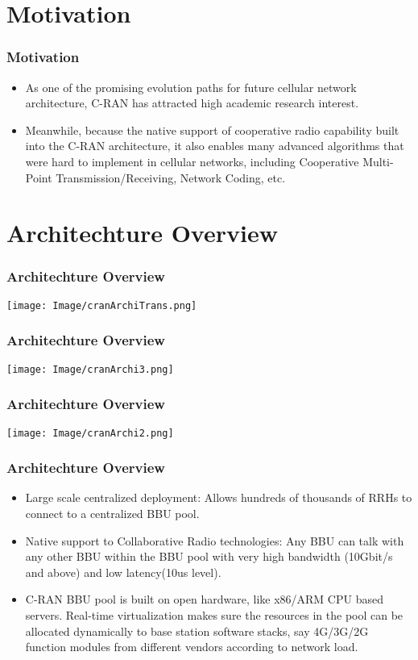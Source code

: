 \documentclass[usenames,dvipsnames]{beamer}
\begin{document}
\section{Motivation}
\begin{frame}
  \frametitle{Motivation}
  \begin{itemize}
    \item As one of the promising evolution paths for future cellular network architecture, C-RAN has attracted high academic research interest.
    \item Meanwhile, because the native support of cooperative radio capability built into the C-RAN architecture, it also enables many advanced algorithms that were hard to implement in cellular networks, including Cooperative Multi-Point Transmission/Receiving, Network Coding, etc.
  \end{itemize}
\end{frame}
\section{Architechture Overview}
\begin{frame}
  \frametitle{Architechture Overview\cite{journals/corr/PengSLMW16}}
  \texttt{[image: Image/cranArchiTrans.png]}
\end{frame}
\begin{frame}
  \frametitle{Architechture Overview\cite{journals/twc/TangTQ15}}
  \texttt{[image: Image/cranArchi3.png]}
\end{frame}
\begin{frame}
  \frametitle{Architechture Overview\cite{conf/wiopt/AlabbasiC17}}
  \texttt{[image: Image/cranArchi2.png]}
\end{frame}
\begin{frame}
  \frametitle{Architechture Overview\cite{wiki:C-RAN}}
  \begin{itemize}
    \item Large scale centralized deployment: Allows hundreds of thousands of RRHs to connect to a centralized BBU pool.
    \item Native support to Collaborative Radio technologies: Any BBU can talk with any other BBU within the BBU pool with very high bandwidth (10Gbit/s and above) and low latency(10us level).
    \item  C-RAN BBU pool is built on open hardware, like x86/ARM CPU based servers. Real-time virtualization makes sure the resources in the pool can be allocated dynamically to base station software stacks, say 4G/3G/2G function modules from different vendors according to network load.
  \end{itemize}
\end{frame}
\end{document}
